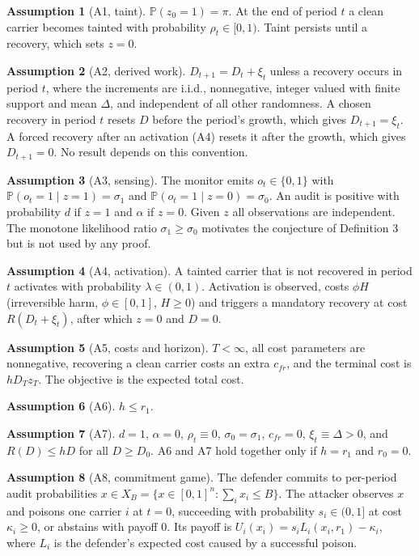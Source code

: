 \documentclass[11pt]{article}
\theoremstyle{definition}
\newtheorem{assumption}{Assumption}
\renewcommand{\P}{\mathbb{P}}
\begin{document}
\begin{assumption}[A1, taint]
$\P(z_0=1)=\pi$. At the end of period $t$ a clean carrier becomes tainted with probability
$\rho_t\in[0,1)$. Taint persists until a recovery, which sets $z=0$.
\end{assumption}
\begin{assumption}[A2, derived work]
$D_{t+1}=D_t+\xi_t$ unless a recovery occurs in period $t$, where the increments are i.i.d.,
nonnegative, integer valued with finite support and mean $\Delta$, and independent of all other
randomness. A chosen recovery in period $t$ resets $D$ before the period's growth, which gives
$D_{t+1}=\xi_t$. A forced recovery after an activation (A4) resets it after the growth, which gives
$D_{t+1}=0$. No result depends on this convention.
\end{assumption}
\begin{assumption}[A3, sensing]
The monitor emits $o_t\in\{0,1\}$ with $\P(o_t=1\mid z=1)=\sigma_1$ and $\P(o_t=1\mid z=0)=\sigma_0$.
An audit is positive with probability $d$ if $z=1$ and $\alpha$ if $z=0$. Given $z$ all observations
are independent. The monotone likelihood ratio $\sigma_1\ge\sigma_0$ motivates the conjecture of
Definition 3 but is not used by any proof.
\end{assumption}
\begin{assumption}[A4, activation]
A tainted carrier that is not recovered in period $t$ activates with probability $\lambda\in(0,1)$.
Activation is observed, costs $\phi H$ (irreversible harm, $\phi\in[0,1]$, $H\ge0$) and triggers a
mandatory recovery at cost $R(D_t+\xi_t)$, after which $z=0$ and $D=0$.
\end{assumption}
\begin{assumption}[A5, costs and horizon]
$T<\infty$, all cost parameters are nonnegative, recovering a clean carrier costs an extra $c_{fr}$, and
the terminal cost is $hD_Tz_T$. The objective is the expected total cost.
\end{assumption}
\begin{assumption}[A6] $h\le r_1$. \end{assumption}
\begin{assumption}[A7]
$d=1$, $\alpha=0$, $\rho_t\equiv0$, $\sigma_0=\sigma_1$, $c_{fr}=0$, $\xi_t\equiv\Delta>0$, and
$R(D)\le hD$ for all $D\ge D_0$. A6 and A7 hold together only if $h=r_1$ and $r_0=0$.
\end{assumption}
\begin{assumption}[A8, commitment game]
The defender commits to per-period audit probabilities $x\in X_B=\{x\in[0,1]^n:\sum_ix_i\le B\}$. The
attacker observes $x$ and poisons one carrier $i$ at $t=0$, succeeding with probability $s_i\in(0,1]$ at
cost $\kappa_i\ge0$, or abstains with payoff $0$. Its payoff is $U_i(x_i)=s_iL_i(x_i,r_1)-\kappa_i$, where
$L_i$ is the defender's expected cost caused by a successful poison.
\end{assumption}
\end{document}
